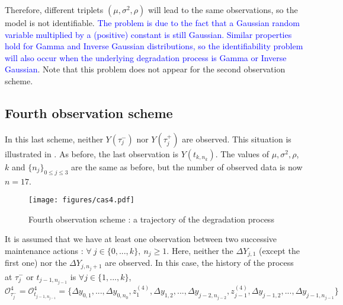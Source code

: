 \noindent Therefore, different triplets $(\mu, \sigma^2, \rho)$ will lead to the same observations, so the model is not identifiable. \textcolor{blue}{The problem is due to the fact that a Gaussian random variable multiplied by a (positive) constant is still Gaussian. Similar properties hold for Gamma and Inverse Gaussian distributions, so the identifiability problem will also occur when the underlying degradation process is Gamma or Inverse Gaussian}. Note that this problem does not appear for the second observation scheme.



\subsection{Fourth observation scheme}
\label{4case}

In this last scheme, neither $Y(\tau_j^-)$ nor $Y(\tau_j^+)$ are observed. This situation is illustrated in . As before, the last observation is $Y(t_{k,n_k})$.
The values of $\mu, \sigma^2,\rho$, $k$ and $\{n_j\}_{0 \leq j \leq 3}$ are the same as before, but the number of observed data is now $n=17$.


\begin{figure}[h!]
\texttt{[image: figures/cas4.pdf]} 
\centering
\caption{Fourth observation scheme : a trajectory of the degradation process}
\label{fig:cas4}
\end{figure}


It is assumed that we have at least one observation between two successive maintenance actions : $\forall\ j \in \{0,...,k\},\ n_j \geq 1$.
Here, neither the $\Delta Y_{j,1}$ (except the first one) nor the $\Delta Y_{j,n_j+1}$ are  observed. In this case, the history of the process at $\tau_j^-$ or $t_{j-1,n_{j-1}}$ is
$\forall j \in \{1,...,k\}$,\\
$\mathcal{O}_{\tau_j^-}^4=\mathcal{O}_{t_{j-1,n_{j-1}}}^4=\{\Delta y_{0,1},...,\Delta y_{0,n_0},z_{1}^{(4)},\Delta y_{1,2},...,\Delta y_{j-2,n_{j-2}},z_{j-1}^{(4)},\Delta y_{j-1,2},...,\Delta y_{j-1,n_{j-1}}\}$


